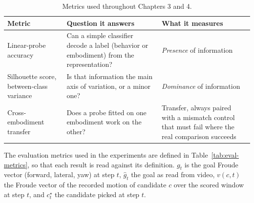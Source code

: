 \documentclass[12pt,a4paper,oneside]{report}
\begin{document}
\begin{table}[H]
\centering
\footnotesize
\setlength{\tabcolsep}{4pt}
\caption{Metrics used throughout Chapters 3 and 4.}
\label{tab:metrics}
\begin{tabularx}{\textwidth}{>{\hsize}Y>{\hsize}Y>{\hsize}Y}
\toprule
\textbf{Metric} & \textbf{Question it answers} & \textbf{What it measures}\\
\midrule
Linear-probe accuracy & Can a simple classifier decode a label (behavior or embodiment) from the
  representation? & \emph{Presence} of information\\
Silhouette score, between-class variance & Is that information the main axis of variation, or a minor one? &
  \emph{Dominance} of information\\
Cross-embodiment transfer & Does a probe fitted on one embodiment work on the other? & Transfer, always paired
  with a mismatch control that must fail where the real comparison succeeds\\
\bottomrule
\end{tabularx}
\end{table}

The evaluation metrics used in the experiments are defined in Table~\ref{tab:eval-metrics}, so that each result is read against its
definition. $g_t$ is the goal Froude vector (forward, lateral, yaw) at step $t$, $\hat g_t$ the goal as read from video,
$v(c,t)$ the Froude vector of the recorded motion of candidate $c$ over the scored window at step $t$, and
$c^{\star}_t$ the candidate picked at step $t$.
\end{document}
